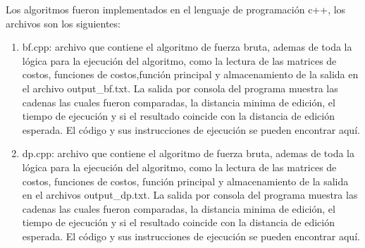 

Los algoritmos fueron implementados en el lenguaje
de programación c++, los archivos son los siguientes:

\begin{enumerate}
    \item bf.cpp: archivo que contiene el algoritmo de fuerza bruta,
        ademas de toda la lógica para la ejecución del algoritmo, como
        la lectura de las matrices de costos, funciones
        de costos,función principal y
        almacenamiento de la salida en el archivo output\_bf.txt. La 
        salida por consola del programa muestra las cadenas las cuales
        fueron comparadas, la distancia minima de edición, el tiempo de
        ejecución y si el resultado coincide con la distancia de edición
        esperada. El código y sus instrucciones de ejecución se pueden
        encontrar aquí.
    \item dp.cpp: archivo que contiene el algoritmo de fuerza bruta,
        ademas de toda la lógica para la ejecución del algoritmo, como 
        la lectura de las matrices de costos, funciones de costos, función
        principal y almacenamiento de la salida en el archivos
        output\_dp.txt. La 
        salida por consola del programa muestra las cadenas las cuales
        fueron comparadas, la distancia minima de edición, el tiempo de
        ejecución y si el resultado coincide con la distancia de edición
        esperada. El código y sus instrucciones de ejecución se pueden
        encontrar aquí.

\end{enumerate}

